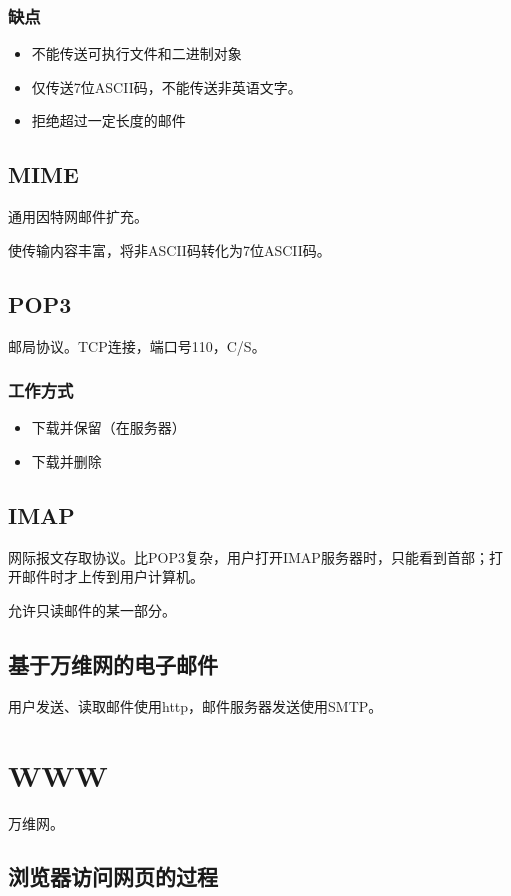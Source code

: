 \subsubsection{缺点}
\begin{itemize}
    \item 不能传送可执行文件和二进制对象
    \item 仅传送7位ASCII码，不能传送非英语文字。
    \item 拒绝超过一定长度的邮件
\end{itemize}


\subsection{MIME}
通用因特网邮件扩充。

使传输内容丰富，将非ASCII码转化为7位ASCII码。


\subsection{POP3}
邮局协议。TCP连接，端口号110，C/S。

\subsubsection{工作方式}
\begin{itemize}
    \item 下载并保留（在服务器）
    \item 下载并删除
\end{itemize}


\subsection{IMAP}
网际报文存取协议。比POP3复杂，用户打开IMAP服务器时，只能看到首部；打开邮件时才上传到用户计算机。

允许只读邮件的某一部分。


\subsection{基于万维网的电子邮件}
用户发送、读取邮件使用http，邮件服务器发送使用SMTP。


\section{WWW}
万维网。

\subsection{浏览器访问网页的过程}

